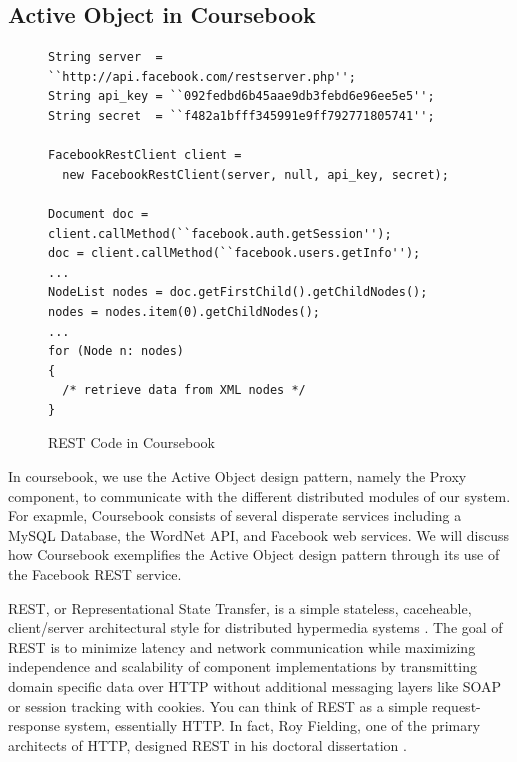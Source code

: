 \subsection{Active Object in Coursebook}

\begin{figure}[t]
\singlespacing
\makebox[\textwidth]{\hrulefill}
\begin{lstlisting}
String server  = ``http://api.facebook.com/restserver.php'';
String api_key = ``092fedbd6b45aae9db3febd6e96ee5e5'';
String secret  = ``f482a1bfff345991e9ff792771805741'';

FacebookRestClient client = 
  new FacebookRestClient(server, null, api_key, secret);

Document doc = client.callMethod(``facebook.auth.getSession'');
doc = client.callMethod(``facebook.users.getInfo'');
...
NodeList nodes = doc.getFirstChild().getChildNodes();
nodes = nodes.item(0).getChildNodes();
...
for (Node n: nodes)
{
  /* retrieve data from XML nodes */
}
\end{lstlisting}
\makebox[\textwidth]{\hrulefill}
\doublespacing
\caption{REST Code in Coursebook}
\label{fig:REST_code}
\end{figure}

In coursebook, we use the Active Object design pattern, namely the Proxy 
component, to communicate with the different distributed modules of our system.
For exapmle, Coursebook consists of several disperate services including a MySQL
Database, the WordNet API, and Facebook web services. We will discuss how
Coursebook exemplifies the Active Object design pattern through its use of the
Facebook REST service.

REST, or Representational State Transfer, is a simple stateless, caceheable,
client/server architectural style for distributed hypermedia systems 
\cite{Fielding00}. The goal of REST is to minimize latency and network
communication while maximizing independence and scalability of component 
implementations by transmitting domain specific data over HTTP without
additional messaging layers like SOAP or session tracking with cookies. You can
think of REST as a simple request-response system, essentially HTTP. In fact,
Roy Fielding, one of the primary architects of HTTP, designed REST in his
doctoral dissertation \cite{Fielding00}.


